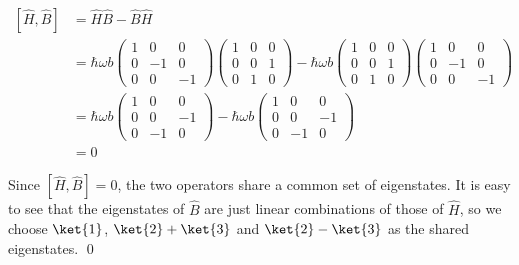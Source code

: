\documentclass[12pt]{article}
\begin{document}
\begin{equation}
    \begin{split}
        [\hat{H}, \hat{B}] &= \hat{H} \hat{B} - \hat{B} \hat{H} \\
        &=
        \hbar \omega b
        \begin{pmatrix}
            1 & 0  & 0  \\
            0 & -1 & 0  \\
            0 & 0  & -1
        \end{pmatrix}
        \begin{pmatrix}
            1 & 0 & 0 \\
            0 & 0 & 1 \\
            0 & 1 & 0
        \end{pmatrix}
        -
        \hbar \omega b
        \begin{pmatrix}
            1 & 0 & 0 \\
            0 & 0 & 1 \\
            0 & 1 & 0
        \end{pmatrix}
        \begin{pmatrix}
            1 & 0  & 0  \\
            0 & -1 & 0  \\
            0 & 0  & -1
        \end{pmatrix} \\
        &= \hbar \omega b
        \begin{pmatrix}
            1 & 0  & 0  \\
            0 & 0  & -1 \\
            0 & -1 & 0
        \end{pmatrix}
        -
        \hbar \omega b
        \begin{pmatrix}
            1 & 0  & 0  \\
            0 & 0  & -1 \\
            0 & -1 & 0
        \end{pmatrix} \\
        &= 0
    \end{split}
\end{equation}

Since $[\hat{H}, \hat{B}] = 0$, the two operators share a common set of eigenstates. It is easy to see that the eigenstates of $\hat{B}$ are just linear combinations of those of $\hat{H}$, so we choose $\ket{1}$, $\ket{2} + \ket{3}$ and $\ket{2} - \ket{3}$ as the shared eigenstates.
\qed
\end{document}

